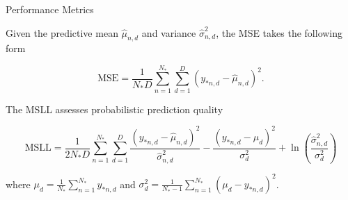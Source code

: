 \begin{frame}{Performance Metrics}

\begin{block}{}
	Given the predictive mean \( \hat{\mu}_{n,d}\) and variance \( \hat{\sigma}^2_{n,d}\), the MSE takes the following form
\end{block}

\[
	\text{MSE} = \frac{1}{N_{*}D} \sum_{n=1}^{N_*} \sum_{d=1}^{D} \left( y_{*n,d} - \hat{\mu}_{n,d} \right)^2.
\]

\begin{block}{}
The MSLL assesses probabilistic prediction quality~\cite{RasmussenW06}
\end{block}

\[
	\text{MSLL} = \frac{1}{2N_{*}D} \sum_{n=1}^{N_*} \sum_{d=1}^{D}  \frac{(y_{*n,d} - \hat{\mu}_{n,d} )^2}{\hat{\sigma}^2_{n,d}}
	- \frac{(y_{*n,d} - \mu_d)^2}{\sigma_d^2} + \ln \left(\frac{\hat{\sigma}^2_{n,d}}{\sigma_d^2}\right)
\]

\begin{block}{}
	where \( \mu_d = \frac{1}{N_*} \sum_{n=1}^{N_*} y_{*n,d}\) and \( \sigma_d^2 = \frac{1}{N_* - 1} \sum_{n=1}^{N_*} (\mu_d - y_{*n,d})^2 \).
\end{block}

\end{frame}

